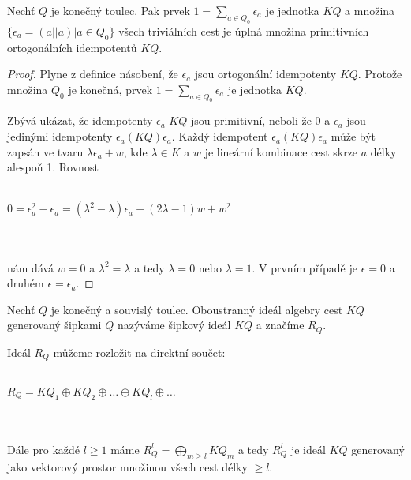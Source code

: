     \begin{dsl}\label{dsl-quiver-idem}
      Nechť $Q$ je konečný toulec. Pak prvek $1=\sum_{a\in Q_0}\epsilon_a$ je 
      jednotka $KQ$ a množina $\{\epsilon_a=(a||a)|a\in Q_0\}$ všech triviálních cest  
      je úplná množina primitivních ortogonálních idempotentů $KQ$.
    \end{dsl}
    \begin{proof}
      Plyne z definice násobení, že $\epsilon_a$ jsou ortogonální idempotenty 
      $KQ$. Protože množina $Q_0$ je konečná, prvek $1=\sum_{a\in Q_0}\epsilon_a$ 
      je jednotka $KQ$. 
      
      Zbývá ukázat, že idempotenty $\epsilon_a$ $KQ$ jsou primitivní, neboli že 0 a $\epsilon_a$ 
      jsou jedinými idempotenty $\epsilon_a(KQ)\epsilon_a$. Každý idempotent $\epsilon_a(KQ)\epsilon_a$ 
      může být zapsán ve tvaru $\lambda \epsilon_a + w$, kde $\lambda\in K$ a $w$ 
      je lineární kombinace cest skrze $a$ délky alespoň 1. Rovnost \\\\
      \centerline{$0=\epsilon_a^2 - \epsilon_a=(\lambda^2-\lambda)\epsilon_a + (2\lambda-1)w+w^2$} 
      \\\\
      nám dává $w=0$ a $\lambda ^2=\lambda $ a tedy $\lambda=0$ nebo 
      $\lambda=1$. V prvním případě je $\epsilon=0$ a druhém 
      $\epsilon=\epsilon_a$.
    \end{proof}   
     
    \begin{dfn}
      Nechť $Q$ je konečný a souvislý toulec. Oboustranný ideál algebry cest $KQ$ 
      generovaný šipkami $Q$ nazýváme šipkový ideál $KQ$ a značíme $R_Q$.
    \end{dfn}
    
    \begin{pzn}
      Ideál $R_Q$ můžeme rozložit na direktní součet: \\\\
      \centerline{ $R_Q=KQ_1\oplus KQ_2 \oplus\ldots\oplus KQ_l\oplus\ldots$ } 
      \\\\
      Dále pro každé $l\geq1$ máme $R^l_Q=\bigoplus_{m\geq l}KQ_m$ a tedy $R_Q^l$ 
      je ideál $KQ$ generovaný jako vektorový prostor množinou všech cest 
      délky $\geq l$.
    \end{pzn}
    
